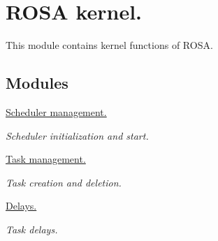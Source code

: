 \hypertarget{group__rosa__kernel}{}\section{R\+O\+S\+A kernel.}
\label{group__rosa__kernel}


This module contains kernel functions of R\+O\+S\+A.  


\subsection*{Modules}
\begin{DoxyCompactItemize}
\item 
\hyperlink{group__rosa__kernel__sm}{Scheduler management.}
\begin{DoxyCompactList}\small\item\em Scheduler initialization and start. \end{DoxyCompactList}\item 
\hyperlink{group__rosa__kernel__tm}{Task management.}
\begin{DoxyCompactList}\small\item\em Task creation and deletion. \end{DoxyCompactList}\item 
\hyperlink{group__rosa__kernel__dm}{Delays.}
\begin{DoxyCompactList}\small\item\em Task delays. \end{DoxyCompactList}\end{DoxyCompactItemize}
